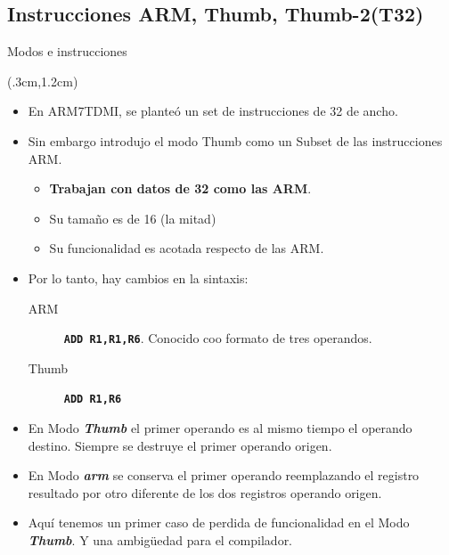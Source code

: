 \documentclass[usenames,table,dvipsnames,aspectratio=169]{beamer}
\newcommand{\arm}{\textbf{\textit{arm}}}
\newcommand{\Thumb}{\textbf{\textit{Thumb}}}
\begin{document}
\subsection{Instrucciones ARM, Thumb, Thumb-2(T32)}
\begin{frame}{Modos e instrucciones}
 \begin{textblock*}{\textwidth}(.3cm,1.2cm) 
  \begin{itemize}[<+(1)->] \justifying
   \item En ARM7TDMI, se planteó un set de instrucciones de \SI{32}{\bit} de ancho.
   \item Sin embargo introdujo el modo Thumb como un Subset de las instrucciones ARM.
   \begin{itemize} \justifying
    \item [-] \textbf{Trabajan con datos de \SI{32}{\bit} como las ARM}.
    \item [-] Su tamaño es de \SI{16}{\bit} (la mitad)
    \item [-] Su funcionalidad es acotada respecto de las ARM.
   \end{itemize}
   \item Por lo tanto, hay cambios en la sintaxis:
   \begin{description}
    \item[  ARM] \textbf{\texttt{ADD R1,R1,R6}}. Conocido coo formato de tres operandos.
    \item[Thumb] \textbf{\texttt{ADD R1,R6}}
   \end{description}
   \item En Modo \Thumb{} el primer operando es al mismo tiempo el operando destino. Siempre se destruye el primer operando origen.
   \item En Modo \arm{} se conserva el primer operando reemplazando el registro resultado por otro diferente de los dos registros operando origen.
   \item Aquí tenemos un primer caso de perdida de funcionalidad en el Modo \Thumb. Y una ambigüedad para el compilador.
  \end{itemize}
 \end{textblock*}
\end{frame}
\end{document}
